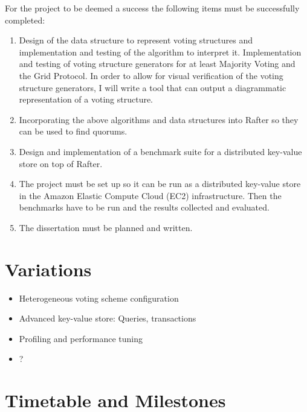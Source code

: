 \documentclass[12pt]{scrartcl}
\begin{document}
For the project to be deemed a success the following items must be successfully completed:

\begin{enumerate}

\item Design of the data structure to represent voting structures and implementation and testing of the algorithm to interpret it. Implementation and testing of voting structure generators for at least Majority Voting and the Grid Protocol. In order to allow for visual verification of the voting structure generators, I will write a tool that can output a diagrammatic representation of a voting structure.

\item Incorporating the above algorithms and data structures into Rafter so they can be used to find quorums.

\item Design and implementation of a benchmark suite for a distributed key-value store on top of Rafter.

\item The project must be set up so it can be run as a distributed key-value store in the Amazon Elastic Compute Cloud (EC2) infrastructure. Then the benchmarks have to be run and the results collected and evaluated.

\item The dissertation must be planned and written.

\end{enumerate}

\section{Variations%
  \label{variations}%
}
%
\begin{itemize}

\item Heterogeneous voting scheme configuration

\item Advanced key-value store: Queries, transactions

\item Profiling and performance tuning

\item ?

\end{itemize}


\section{Timetable and Milestones%
  \label{timetable-and-milestones}%
}
\end{document}
